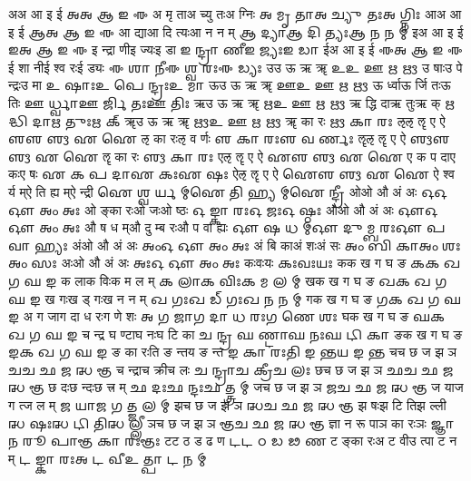 \documentclass{article}
\begin{document}
\card
{अ}{अ आ इ ई}%
{𑌅}{𑌅 𑌆 𑌇 𑌈}
{{अ मृ ता}{अ च्यु तः}{अ ग्निः}}%
{{𑌅 𑌮𑍃 𑌤𑌾}{𑌅 𑌚𑍍𑌯𑍁 𑌤𑌃}{𑌅 𑌗𑍍𑌨𑌿𑌃}}
\card
{आ}{अ आ इ ई}%
{𑌆}{𑌅 𑌆 𑌇 𑌈}
{{आ द्या}{आ दि त्यः}{आ न न म्}}%
{{𑌆 𑌦𑍍𑌯𑌾}{𑌆 𑌦𑌿 𑌤𑍍𑌯𑌃}{𑌆 𑌨 𑌨 𑌮𑍍}}
\card
{इ}{अ आ इ ई}%
{𑌇}{𑌅 𑌆 𑌇 𑌈}
{{इ न्द्रा णी}{इ ज्यः}{इ डा}}%
{{𑌇 𑌨𑍍𑌦𑍍𑌰𑌾 𑌣𑍀}{𑌇 𑌜𑍍𑌯𑌃}{𑌇 𑌡𑌾}}
\card
{ई}{अ आ इ ई}%
{𑌈}{𑌅 𑌆 𑌇 𑌈}
{{ई शा नी}{ई श्व रः}{ई ड्यः}}%
{{𑌈 𑌶𑌾 𑌨𑍀}{𑌈 𑌶𑍍𑌵 𑌰𑌃}{𑌈 𑌡𑍍𑌯𑌃}}
\card
{उ}{उ ऊ ऋ ॠ}%
{𑌉}{𑌉 𑌊 𑌋 𑍠}
{{उ षाः}{उ पे न्द्रः}{उ मा}}%
{{𑌉 𑌷𑌾𑌃}{𑌉 𑌪𑍇 𑌨𑍍𑌦𑍍𑌰𑌃}{𑌉 𑌮𑌾}}
\card
{ऊ}{उ ऊ ऋ ॠ}%
{𑌊}{𑌉 𑌊 𑌋 𑍠}
{{ऊ र्ध्वा}{ऊ र्जि तः}{ऊ तिः}}%
{{𑌊 𑌰𑍍𑌧𑍍𑌵𑌾}{𑌊 𑌰𑍍𑌜𑌿 𑌤𑌃}{𑌊 𑌤𑌿𑌃}}
\card
{ऋ}{उ ऊ ऋ ॠ}%
{𑌋}{𑌉 𑌊 𑌋 𑍠}
{{ऋ द्धि दा}{ऋ तुः}{ऋ क्}}%
{{𑌋 𑌦𑍍𑌧𑌿 𑌦𑌾}{𑌋 𑌤𑍁𑌃}{𑌋 𑌕𑍍}}
\card
{ॠ}{उ ऊ ऋ ॠ}%
{𑍠}{𑌉 𑌊 𑌋 𑍠}
{{ॠ का रः}{ }{ }}%
{{𑍠 𑌕𑌾 𑌰𑌃}{ }{ }}
\card
{ऌ}{ऌ ॡ ए ऐ}%
{𑌌}{𑌌 𑍡 𑌏 𑌐}
{{ऌ का रः}{ऌ व र्णः}{ }}%
{{𑌌 𑌕𑌾 𑌰𑌃}{𑌌 𑌵 𑌰𑍍𑌣𑌃}{ }}
\card
{ॡ}{ऌ ॡ ए ऐ}%
{𑍡}{𑌌 𑍡 𑌏 𑌐}
{{ॡ का रः}{ }{ }}%
{{𑍡 𑌕𑌾 𑌰𑌃}{ }{ }}
\card
{ए}{ऌ ॡ ए ऐ}%
{𑌏}{𑌌 𑍡 𑌏 𑌐}
{{ए क प दा}{ए कः}{ए षः}}%
{{𑌏 𑌕 𑌪 𑌦𑌾}{𑌏 𑌕𑌃}{𑌏 𑌷𑌃}}
\card
{ऐ}{ऌ ॡ ए ऐ}%
{𑌐}{𑌌 𑍡 𑌏 𑌐}
{{ऐ श्व र्य म्}{ऐ ति ह्य म्}{ऐ न्द्री}}%
{{𑌐 𑌶𑍍𑌵 𑌰𑍍𑌯 𑌮𑍍}{𑌐 𑌤𑌿 𑌹𑍍𑌯 𑌮𑍍}{𑌐 𑌨𑍍𑌦𑍍𑌰𑍀}}
\card
{ओ}{ओ औ अं अः}%
{𑌓}{𑌓 𑌔 𑌅𑌂 𑌅𑌃}
{{ओ ङ्का रः}{ओ जः}{ओ ष्ठः}}%
{{𑌓 𑌙𑍍𑌕𑌾 𑌰𑌃}{𑌓 𑌜𑌃}{𑌓 𑌷𑍍𑌠𑌃}}
\card
{औ}{ओ औ अं अः}%
{𑌔}{𑌓 𑌔 𑌅𑌂 𑌅𑌃}
{{औ ष ध म्}{औ दु म्ब रः}{औ प वा ह्यः}}%
{{𑌔 𑌷 𑌧 𑌮𑍍}{𑌔 𑌦𑍁 𑌮𑍍𑌬 𑌰𑌃}{𑌔 𑌪 𑌵𑌾 𑌹𑍍𑌯𑌃}}
\card
{अं}{ओ औ अं अः}%
{𑌅𑌂}{𑌓 𑌔 𑌅𑌂 𑌅𑌃}
{{अं बि का}{अं शः}{अं सः}}%
{{𑌅𑌂 𑌬𑌿 𑌕𑌾}{𑌅𑌂 𑌶𑌃}{𑌅𑌂 𑌸𑌃}}
\card
{अः}{ओ औ अं अः}%
{𑌅𑌃}{𑌓 𑌔 𑌅𑌂 𑌅𑌃}
{{कः}{वः}{यः}}%
{{𑌕𑌃}{𑌵𑌃}{𑌯𑌃}}
\card
{क}{क ख ग घ ङ}%
{𑌕}{𑌕 𑌖 𑌗 𑌘 𑌙}
{{क ला}{क विः}{क म ल म्}}%
{{𑌕 𑌲𑌾}{𑌕 𑌵𑌿𑌃}{𑌕 𑌮 𑌲 𑌮𑍍}}
\card
{ख}{क ख ग घ ङ}%
{𑌖}{𑌕 𑌖 𑌗 𑌘 𑌙}
{{ख गः}{ख ड् गः}{ख न न म्}}%
{{𑌖 𑌗𑌃}{𑌖 𑌡𑍍 𑌗𑌃}{𑌖 𑌨 𑌨 𑌮𑍍}}
\card
{ग}{क ख ग घ ङ}%
{𑌗}{𑌕 𑌖 𑌗 𑌘 𑌙}
{{अ ग जा}{ग दा ध रः}{ग णे शः}}%
{{𑌅 𑌗 𑌜𑌾}{𑌗 𑌦𑌾 𑌧 𑌰𑌃}{𑌗 𑌣𑍇 𑌶𑌃}}
\card
{घ}{क ख ग घ ङ}%
{𑌘}{𑌕 𑌖 𑌗 𑌘 𑌙}
{{च न्द्र घ ण्टा}{घ नः}{घ टि का}}%
{{𑌚 𑌨𑍍𑌦𑍍𑌰 𑌘 𑌣𑍍𑌟𑌾}{𑌘 𑌨𑌃}{𑌘 𑌟𑌿 𑌕𑌾}}
\card
{ङ}{क ख ग घ ङ}%
{𑌙}{𑌕 𑌖 𑌗 𑌘 𑌙}
{{ङ का रः}{ति ङ न्त}{य ङ न्त}}%
{{𑌙 𑌕𑌾 𑌰𑌃}{𑌤𑌿 𑌙 𑌨𑍍𑌤}{𑌯 𑌙 𑌨𑍍𑌤}}
\card
{च}{च छ ज झ ञ}%
{𑌚}{𑌚 𑌛 𑌜 𑌝 𑌞}
{{च न्द्रा}{च क्री}{च लः}}%
{{𑌚 𑌨𑍍𑌦𑍍𑌰𑌾}{𑌚 𑌕𑍍𑌰𑍀}{𑌚 𑌲𑌃}}
\card
{छ}{च छ ज झ ञ}%
{𑌛}{𑌚 𑌛 𑌜 𑌝 𑌞}
{{छ दः}{छ न्दः}{छ त्त्र म्}}%
{{𑌛 𑌦𑌃}{𑌛 𑌨𑍍𑌦𑌃}{𑌛 𑌤𑍍𑌤𑍍𑌰 𑌮𑍍}}
\card
{ज}{च छ ज झ ञ}%
{𑌜}{𑌚 𑌛 𑌜 𑌝 𑌞}
{{ज या}{ज ग त्}{ज ल म्}}%
{{𑌜 𑌯𑌾}{𑌜 𑌗 𑌤𑍍}{𑌜 𑌲 𑌮𑍍}}
\card
{झ}{च छ ज झ ञ}%
{𑌝}{𑌚 𑌛 𑌜 𑌝 𑌞}
{{झ षः}{झ टि ति}{झ ल्ली}}%
{{𑌝 𑌷𑌃}{𑌝 𑌟𑌿 𑌤𑌿}{𑌝 𑌲𑍍𑌲𑍀}}
\card
{ञ}{च छ ज झ ञ}%
{𑌞}{𑌚 𑌛 𑌜 𑌝 𑌞}
{{ज्ञा न रू पा}{ञ का रः}{ञः}}%
{{𑌜𑍍𑌞𑌾 𑌨 𑌰𑍂 𑌪𑌾}{𑌞 𑌕𑌾 𑌰𑌃}{𑌞𑌃}}
\card
{ट}{ट ठ ड ढ ण}%
{𑌟}{𑌟 𑌠 𑌡 𑌢 𑌣}
{{ट ङ्का रः}{अ ट वी}{उ त्पा ट न म्}}%
{{𑌟 𑌙𑍍𑌕𑌾 𑌰𑌃}{𑌅 𑌟 𑌵𑍀}{𑌉 𑌤𑍍𑌪𑌾 𑌟 𑌨 𑌮𑍍}}
\end{document}
